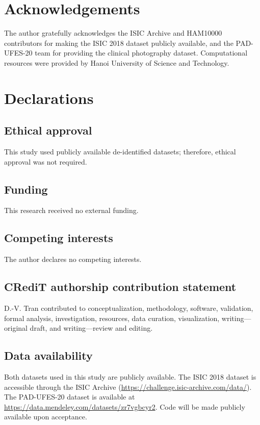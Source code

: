 \section*{Acknowledgements}
The author gratefully acknowledges the ISIC Archive and HAM10000 contributors for making the ISIC 2018 dataset publicly available, and the PAD-UFES-20 team for providing the clinical photography dataset. Computational resources were provided by Hanoi University of Science and Technology.

\section*{Declarations}

\subsection*{Ethical approval}
This study used publicly available de-identified datasets; therefore, ethical approval was not required.

\subsection*{Funding}
This research received no external funding.

\subsection*{Competing interests}
The author declares no competing interests.

\subsection*{CRediT authorship contribution statement}
D.-V. Tran contributed to conceptualization, methodology, software, validation, formal analysis, investigation, resources, data curation, visualization, writing---original draft, and writing---review and editing.

\subsection*{Data availability}
Both datasets used in this study are publicly available. The ISIC 2018 dataset is accessible through the ISIC Archive (\url{https://challenge.isic-archive.com/data/}). The PAD-UFES-20 dataset is available at \url{https://data.mendeley.com/datasets/zr7vgbcyr2}. Code will be made publicly available upon acceptance.
